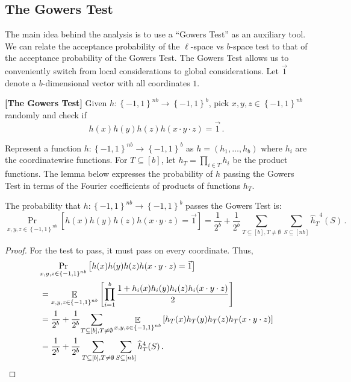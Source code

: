 \documentclass{toc}
\newcommand\set[1]{{\left\{ #1 \right\}}}
\newcommand\Prob[2]{{\Pr_{#1}\left[ {#2} \right]}}
\newcommand\Expect[2]{{\mathop{\mathbb{E}}_{#1}\left[ {#2} \right]}}
\newcommand\cube[1]{ { \set{-1,1}^{#1} } }
\begin{document}
%
%
%
%
%
\subsection{The Gowers Test}  %
%
The main idea behind the analysis is to use a %
%
``Gowers Test'' as an auxiliary tool. We can relate the acceptance probability
of the $\ell$-space vs $b$-space test to that of the acceptance probability of
the Gowers Test. The Gowers Test allows us
to conveniently switch from local considerations to global considerations.
Let $\vec{1}$ denote a $b$-dimensional vector with all coordinates $1$.

\begin{definition}{\bf [The Gowers Test]} Given $h: \cube{nb} \to \cube{b}$,
pick $x,y,z\in  \cube{nb}$ randomly and check if
$$h(x)h(y)h(z)h(x\cdot y \cdot z)=\vec{1}\,. $$%
\end{definition}

Represent a function $h: \cube{nb} \to \cube{b}$ as $h = (h_1,\ldots,h_b)$ where $h_i$ are the
coordinatewise functions. For $T \subseteq [b]$, let $h_T = \prod_{i\in T} h_i$ be the product functions.
The lemma below expresses the probability of $h$ passing the Gowers Test
in terms of the Fourier coefficients of products of functions $h_T$.




\begin{lemma}\label{lemma:gowers_to_fourier}
 The probability that  $h\colon \cube{nb} \to \cube{b}$ passes the Gowers Test is:
\[
\Prob{x,y,z\in \cube{nb}}{h(x)h(y)h(z)h(x\cdot y \cdot z)=\vec{1}}=
\frac{1}{2^b} + \frac{1}{2^b} \sum\limits_{T\subseteq [b], T\neq \emptyset}{\sum\limits_{S \subseteq [nb]}{{\widehat{h}_T}^4(S)}}\,.%
\]
\end{lemma}
\begin{proof}
For the test to pass, it must pass on every coordinate. Thus,
%
%
%
%
%
%
%
%
%
%
\begin{align*}
 & \Prob{x,y,z \in \cube{nb}}{h(x)h(y)h(z)h(x\cdot y\cdot z)=\vec{1}} \\
& = \Expect{x,y,z \in \cube{nb}}{  \prod_{i=1}^b  \frac{1+h_i(x)h_i(y)h_i(z)h_i(x\cdot y\cdot z)}{2}}  \\
& = \frac{1}{2^b} + \frac{1}{2^b} {\sum\limits_{T\subseteq [b], T \neq \emptyset}{\Expect{x,y,z\in \cube{nb}}{h_T(x)h_T(y)h_T(z)h_T(x\cdot y\cdot z)}}}  \\
& =  \frac{1}{2^b} + \frac{1}{2^b} \sum\limits_{T\subseteq [b], T \neq \emptyset}{\sum\limits_{S \subseteq [nb]}{{\widehat{h}_T}^4(S)}}
\,.    \qedhere %
\end{align*}
\end{proof}
\end{document}
